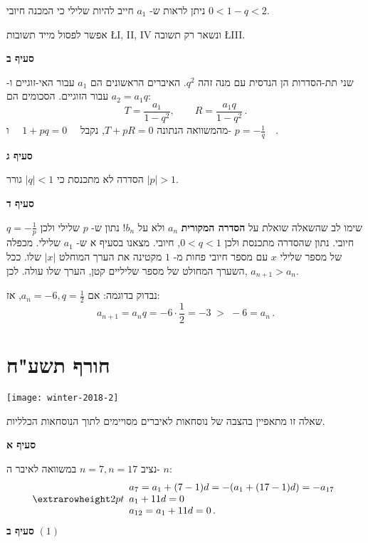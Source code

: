 \np

ניתן לראות ש-%
$a_1$
חייב להיות שלילי כי המכנה חיובי
$0 < 1-q < 2$.

אפשר לפסול מייד תשובות 
\L{I, II, IV}
ונשאר רק תשובה
\L{III}.

\smallskip

\textbf{סעיף ב}

שני תת-הסדרות הן הנדסית עם מנה זהה
$q^2$.
האיברים הראשונים הם
$a_1$
עבור האי-זוגיים ו-%
$a_2=a_1q$
עבור הזוגיים. הסכומים הם:
\[
T = \frac{a_1}{1-q^2},\quad\quad R = \frac{a_1q}{1-q^2}\,.
\]
מהמשוואה הנתונה
$T+pR=0$,
נקבל
$\quad 1+pq=0\quad$
ו-%
$p=-\displaystyle\frac{1}{q}\quad$.

\smallskip

\textbf{סעיף ג}

הסדרה לא מתכנסת כי 
$|q|<1$
גורר
$|p|>1$.

\smallskip

\textbf{סעיף ד}

שימו לב שהשאלה שואלת על
\textbf{הסדרה המקורית}
$a_n$
ולא על 
$b_n$!
נתון ש-%
$p$
שלילי ולכן
$q=-\displaystyle\frac{1}{p}$
חיובי. נתון שהסדרה מתכנסת ולכן
$0<q<1$,
חיובי. מצאנו בסעיף א ש-%
$a_1$
שלילי. מכפלה של מספר שלילי
$x$
עם מספר חיובי פחות מ-%
$1$
מקטינה את הערך המוחלט
$|x|$
שלו. ככל השערך המחולט של מספר שליליים קטן, הערך שלו עולה. לכן,
$a_{n+1}>a_n$.

נבדוק בדוגמה: אם 
$a_n=-6,q=\frac{1}{2}$,
אז:
\[
a_{n+1} = a_nq = -6\cdot \frac{1}{2} = -3 \;> \; -6 =a_n\,.
\]



\np
\section{חורף תשע"ח}

\begin{center}
\texttt{[image: winter-2018-2]}
\end{center}

\vspace{-1ex}

שאלה זו מתאפיין בהצבה של נוסחאות לאיברים מסויימים לתוך הנוסחאות הכלליות.

\smallskip

\textbf{סעיף א}

נציב 
$n=7, n=17$
במשוואה לאיבר ה-%
$n$:
\[
\erh{2pt}
\begin{array}{l}
a_7=a_1+(7-1)d = -(a_1+(17-1)d)=-a_{17}\\
a_1+11d=0\\
a_{12}=a_1+11d=0\,.
\end{array}
\]
\textbf{סעיף ב}
$(1)$

